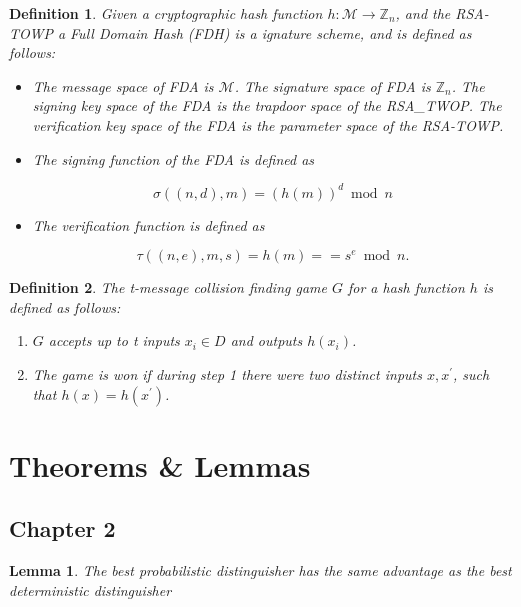 \documentclass[a4paper,german]{article}
\newtheorem{definition}{Definition}
\newtheorem{lemma}{Lemma}
\begin{document}
\begin{definition}
	Given a cryptographic hash function $h: \mathcal{M} \rightarrow \mathbb{Z}_n$, and the RSA-TOWP a Full Domain Hash (FDH) is a ignature scheme, and is defined as follows:

	\begin{itemize}
	
		\item  The message space of FDA is $\mathcal{M}$. The signature space of FDA is $\mathbb{Z}_n$. The signing key space of the FDA is the trapdoor space of the RSA\_TWOP. The verification key space of the FDA is the parameter space of the RSA-TOWP.
		\item  The signing function of the FDA is defined as 

			\[
				\sigma((n, d), m) = (h(m))^d \bmod n
			\] 
		\item  The verification function is defined as

			\[
				\tau((n, e), m, s) = h(m) == s^e \bmod n
			.\] 
	
	\end{itemize}


\end{definition}

\begin{definition}
	The t-message collision finding game $G$ for a hash function $h$ is defined as follows:

	\begin{enumerate}
	
		\item  $G$ accepts up to t inputs $x_i \in D$ and outputs $h(x_i)$.
		\item  The game is won if during step 1 there were two distinct inputs $x, x^\prime$, such that $h(x) = h(x^\prime)$.
	
	\end{enumerate}
\end{definition}

\section*{Theorems \& Lemmas}
\subsection*{Chapter 2}
\begin{lemma}
	The best probabilistic distinguisher has the same advantage as the best deterministic distinguisher
\end{lemma}
\end{document}
